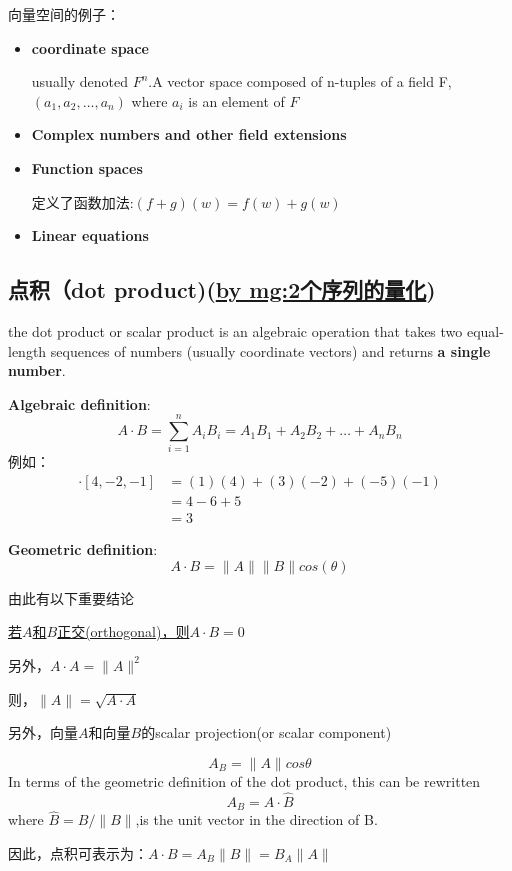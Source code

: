 向量空间的例子：
\begin{itemize}
\item{
\textbf{coordinate space}\par
usually denoted $F^n$.A vector space composed of  n-tuples of a field F,$(a_1,a_2,\dots,a_n)$ where $a_i$ is an element of $F$
}
\item{
\textbf{Complex numbers and other field extensions}\par
}
\item{
\textbf{Function spaces}\par
定义了函数加法:$(f+g)(w)=f(w)+g(w)$
}
\item{
\textbf{Linear equations}\par
}
\end{itemize}

\subsection{点积（dot product)(\underline{by mg:2个序列的量化})}
\cite{dot product}
the dot product or scalar product is an algebraic operation that takes two equal-length sequences of numbers (usually coordinate vectors) and returns \textbf{a single number}. 

\textbf{Algebraic definition}:
\[ A \cdot B=\sum_{i=1}^n A_iB_i=A_1B_1+A_2B_2+\dots+A_nB_n\]
例如：
\begin{align*}
[1,2,-5] \cdot [4,-2,-1]&=(1)(4)+(3)(-2)+(-5)(-1) \\
&= 4-6+5 \\
&= 3
\end{align*}

\textbf{Geometric definition}:
\[A \cdot B=\|A\| \|B\|cos(\theta)\]

由此有以下重要结论\par
\underline{若$A$和$B$正交(orthogonal)，则$A \cdot B = 0$} \par
另外，$ A \cdot A =\|A\|^2 $ \par
则，$ \|A\|= \sqrt{A \cdot A} $ 

另外，向量$A$和向量$B$的scalar projection(or scalar component)\par
\[ A_B=\|A\|cos\theta \]
In terms of the geometric definition of the dot product, this can be rewritten
\[ A_B=A \cdot \widehat{B}\]
where $\widehat{B}=B/\|B\|$,is the unit vector in the direction of B.

因此，点积可表示为：$A \cdot B=A_B \|B\|=B_A \|A\|$


